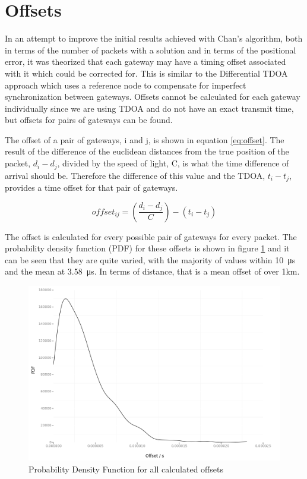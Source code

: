 \documentclass[a4paper]{report}
\begin{document}
  \section{Offsets}

    In an attempt to improve the initial results achieved with Chan's algorithm, both in terms of the number of packets with a solution and in terms of the positional error, it was theorized that each gateway may have a timing offset associated with it which could be corrected for. This is similar to the Differential TDOA approach \cite{Li2014} which uses a reference node to compensate for imperfect synchronization between gateways. Offsets cannot be calculated for each gateway individually since we are using TDOA and do not have an exact transmit time, but offsets for pairs of gateways can be found.

    The offset of a pair of gateways, i and j, is shown in equation \ref{eq:offset}. The result of the difference of the euclidean distances from the true position of the packet, \(d_i - d_j\), divided by the speed of light, C, is what the time difference of arrival should be. Therefore the difference of this value and the TDOA, \(t_i - t_j\), provides a time offset for that pair of gateways.

    \begin{equation}
    \label{eq:offset}
    offset_{ij} = (\frac{d_i - d_j}{C}) - (t_i - t_j)
    \end{equation}

    The offset is calculated for every possible pair of gateways for every packet. The probability density function (PDF) for these offsets is shown in figure \ref{fig:offsetpdf} and it can be seen that they are quite varied, with the majority of values within \SI{10}{\micro\second} and the mean at \SI{3.58}{\micro\second}. In terms of distance, that is a mean offset of over 1km.

    \begin{figure}[ht]
    \centering
    \includegraphics[width=12cm]{figures/offsetpdf.png}
    \caption{Probability Density Function for all calculated offsets}
    \label{fig:offsetpdf}
    \end{figure}
\end{document}
